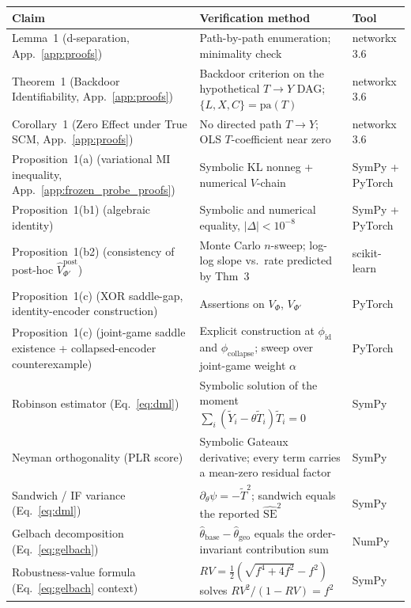 \documentclass{article}
\begin{document}
\begin{table}[H]
\centering
\footnotesize
\setlength{\tabcolsep}{4pt}
\begin{tabular}{p{} p{} p{}}
\toprule
\textbf{Claim} & \textbf{Verification method} & \textbf{Tool} \\
\midrule
Lemma~1 (d-separation, App.~\ref{app:proofs}) & Path-by-path enumeration; minimality check & networkx 3.6 \\
Theorem~1 (Backdoor Identifiability, App.~\ref{app:proofs}) & Backdoor criterion on the hypothetical $T \to Y$ DAG; $\{L,X,C\}=\mathrm{pa}(T)$ & networkx 3.6 \\
Corollary~1 (Zero Effect under True SCM, App.~\ref{app:proofs}) & No directed path $T \to Y$; OLS $T$-coefficient near zero & networkx 3.6 \\
Proposition~1(a) (variational MI inequality, App.~\ref{app:frozen_probe_proofs}) & Symbolic KL nonneg + numerical $V$-chain & SymPy + PyTorch \\
Proposition~1(b1) (algebraic identity) & Symbolic and numerical equality, $|\Delta| < 10^{-8}$ & SymPy + PyTorch \\
Proposition~1(b2) (consistency of post-hoc $\hat V_{\Phi'}^{\text{post}}$) & Monte Carlo $n$-sweep; log-log slope vs.\ rate predicted by \citet{xu2020theory} Thm~3 & scikit-learn \\
Proposition~1(c) (XOR saddle-gap, identity-encoder construction) & Assertions on $V_\Phi$, $V_{\Phi'}$ & PyTorch \\
Proposition~1(c) (joint-game saddle existence + collapsed-encoder counterexample) & Explicit construction at $\phi_{\text{id}}$ and $\phi_{\text{collapse}}$; sweep over joint-game weight $\alpha$ & PyTorch \\
\midrule
Robinson estimator (Eq.~\ref{eq:dml}) & Symbolic solution of the moment $\sum_i(\tilde Y_i-\theta\tilde T_i)\tilde T_i=0$ & SymPy \\
Neyman orthogonality (PLR score) & Symbolic Gateaux derivative; every term carries a mean-zero residual factor & SymPy \\
Sandwich / IF variance (Eq.~\ref{eq:dml}) & $\partial_\theta\psi=-\tilde T^2$; sandwich equals the reported $\widehat{\mathrm{SE}}^2$ & SymPy \\
Gelbach decomposition (Eq.~\ref{eq:gelbach}) & $\hat\theta_{\text{base}}-\hat\theta_{\text{geo}}$ equals the order-invariant contribution sum & NumPy \\
Robustness-value formula (Eq.~\ref{eq:gelbach} context) & $RV=\tfrac12(\sqrt{f^4+4f^2}-f^2)$ solves $RV^2/(1-RV)=f^2$ & SymPy \\

\end{tabular}
\end{table}
\end{document}
